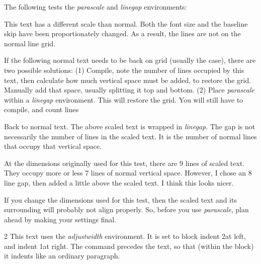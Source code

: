 \documentclass[test]{novel} %
\begin{document}
\null



\clearpage



The following tests the \textit{parascale}  and \textit{linegap} environments:

\begin{linegap}{8}
\vspace{0.4\nbs}
\begin{parascale}[0.8]
This text has a different scale than normal. Both the font size and the baseline skip have been proportionately changed. As a result, the lines are not on the normal line grid.\par
If the following normal text needs to be back on grid (usually the case), there are two possible solutions: (1) Compile, note the number of lines occupied by this text, then calculate how much vertical space must be added, to restore the grid. Manually add that space, usually splitting it top and bottom. (2) Place \textit{parascale} within a \textit{linegap} environment. This will restore the grid. You will still have to compile, and count lines\par
\end{parascale}
\end{linegap}

Back to normal text. The above scaled text is wrapped in \textit{linegap}. The gap is not necessarily the number of lines in the scaled text. It is the number of normal lines that occupy that vertical space.

At the dimensions originally used for this test, there are 9 lines of scaled text. They occupy more or less 7 lines of normal vertical space. However, I chose an 8 line gap, then added a little \string\vspace\space above the scaled text. I think this looks nicer.

If you change the dimensions used for this test, then the scaled text and its surrounding will probably not align properly. So, before you use \textit{parascale}, plan ahead by making your settings final.

\null

\begin{adjustwidth}{2\normalparindent}{\normalparindent}
\forceindent This text uses the \textit{adjustwidth} environment. It is set to block indent 2\string\normalparindent\space at left, and indent 1\string\normalparindent\space at right. The \string\forceindent\space command precedes the text, so that (within the block) it indents like an ordinary paragraph.\par
\end{adjustwidth}
\end{document}
